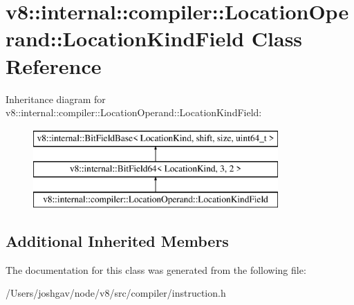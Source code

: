 \hypertarget{classv8_1_1internal_1_1compiler_1_1_location_operand_1_1_location_kind_field}{}\section{v8\+:\+:internal\+:\+:compiler\+:\+:Location\+Operand\+:\+:Location\+Kind\+Field Class Reference}
\label{classv8_1_1internal_1_1compiler_1_1_location_operand_1_1_location_kind_field}
Inheritance diagram for v8\+:\+:internal\+:\+:compiler\+:\+:Location\+Operand\+:\+:Location\+Kind\+Field\+:\begin{figure}[H]
\begin{center}
\leavevmode
\includegraphics[height=3.000000cm]{classv8_1_1internal_1_1compiler_1_1_location_operand_1_1_location_kind_field}
\end{center}
\end{figure}
\subsection*{Additional Inherited Members}


The documentation for this class was generated from the following file\+:\begin{DoxyCompactItemize}
\item 
/\+Users/joshgav/node/v8/src/compiler/instruction.\+h\end{DoxyCompactItemize}
